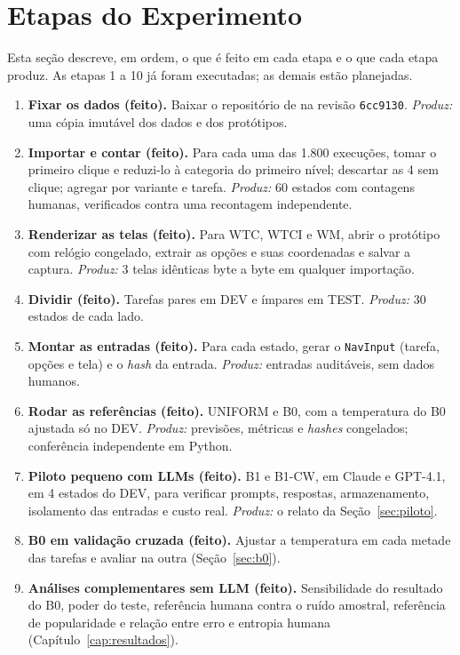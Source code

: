 \documentclass[12pt,oneside,a4paper,chapter=TITLE,english,brazil]{abntex2}
\newcommand{\code}[1]{\texttt{#1}}
\begin{document}
\section{Etapas do Experimento}
\label{sec:passos}

Esta seção descreve, em ordem, o que é feito em cada etapa e o que cada etapa produz. As etapas 1 a 10 já foram executadas; as demais estão planejadas.

\begin{enumerate}[label=\textbf{Passo \arabic*.},leftmargin=2.1cm,itemsep=3pt]
\item \textbf{Fixar os dados (feito).} Baixar o repositório de  na revisão \code{6cc9130}. \emph{Produz:} uma cópia imutável dos dados e dos protótipos.
\item \textbf{Importar e contar (feito).} Para cada uma das 1.800 execuções, tomar o primeiro clique e reduzi-lo à categoria do primeiro nível; descartar as 4 sem clique; agregar por variante e tarefa. \emph{Produz:} 60 estados com contagens humanas, verificados contra uma recontagem independente.
\item \textbf{Renderizar as telas (feito).} Para WTC, WTCI e WM, abrir o protótipo com relógio congelado, extrair as opções e suas coordenadas e salvar a captura. \emph{Produz:} 3 telas idênticas byte a byte em qualquer importação.
\item \textbf{Dividir (feito).} Tarefas pares em DEV e ímpares em TEST. \emph{Produz:} 30 estados de cada lado.
\item \textbf{Montar as entradas (feito).} Para cada estado, gerar o \code{NavInput} (tarefa, opções e tela) e o \textit{hash} da entrada. \emph{Produz:} entradas auditáveis, sem dados humanos.
\item \textbf{Rodar as referências (feito).} UNIFORM e B0, com a temperatura do B0 ajustada só no DEV. \emph{Produz:} previsões, métricas e \textit{hashes} congelados; conferência independente em Python.
\item \textbf{Piloto pequeno com LLMs (feito).} B1 e B1-CW, em Claude e GPT-4.1, em 4 estados do DEV, para verificar prompts, respostas, armazenamento, isolamento das entradas e custo real. \emph{Produz:} o relato da Seção~\ref{sec:piloto}.
\item \textbf{B0 em validação cruzada (feito).} Ajustar a temperatura em cada metade das tarefas e avaliar na outra (Seção~\ref{sec:b0}).
\item \textbf{Análises complementares sem LLM (feito).} Sensibilidade do resultado do B0, poder do teste, referência humana contra o ruído amostral, referência de popularidade e relação entre erro e entropia humana (Capítulo~\ref{cap:resultados}).

\end{enumerate}
\end{document}
